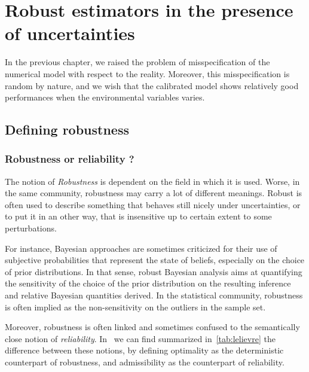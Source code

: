 \documentclass[../../Main_ManuscritThese.tex]{subfiles}
\begin{document}
\chapter{Robust estimators in the presence of uncertainties} 
\label{chap:robust_estimators}
\minitoc
\newpage
\subfileLocal{\pagestyle{contentStyle}}
In the previous chapter, we raised the problem of misspecification of the numerical model with respect to the reality. Moreover, this misspecification is random by nature, and we wish that the calibrated model shows relatively good performances when the environmental variables varies.
\begin{figure}[ht]
  \begin{center}
  \resizebox{\linewidth}{!}
  {
      
    }
    \end{center}
  \caption{\label{fig:label} }
\end{figure}


\section{Defining robustness}
\subsection{Robustness or reliability ?}


The notion of \emph{Robustness} is dependent on the field in which it is used. Worse, in the same community, robustness may carry a lot of different meanings. Robust is often used to describe something that behaves still nicely under uncertainties, or to put it in an other way, that is insensitive up to certain extent to some perturbations.

For instance, Bayesian approaches are sometimes criticized for their use of subjective probabilities that represent the state of beliefs, especially on the choice of prior distributions. In that sense, robust Bayesian analysis aims at quantifying the sensitivity of the choice of the prior distribution on the resulting inference and relative Bayesian quantities derived. In the statistical community, robustness is often implied as the non-sensitivity on the outliers in the sample set.

Moreover, robustness is often linked and sometimes confused to the semantically close notion of \emph{reliability}. In~\cite{lelievre_consideration_2016} we can find summarized in~\cref{tab:lelievre} the difference between these notions,  by defining optimality as the deterministic counterpart of robustness, and admissibility as the counterpart of reliability.
\end{document}
